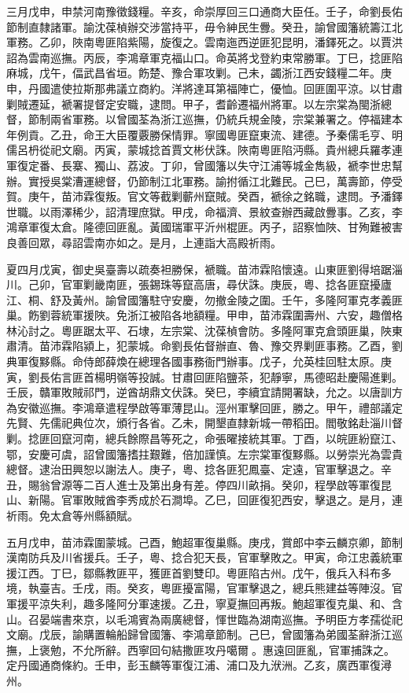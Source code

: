 \begin{pinyinscope}
三月戊申，申禁河南豫徵錢糧。辛亥，命崇厚回三口通商大臣任。壬子，命劉長佑節制直隸諸軍。諭沈葆楨辦交涉當持平，毋令紳民生釁。癸丑，諭曾國籓統籌江北軍務。乙卯，陜南粵匪陷紫陽，旋復之。雲南迤西逆匪犯昆明，潘鐸死之。以賈洪詔為雲南巡撫。丙辰，李鴻章軍克福山口。命英將戈登約束常勝軍。丁巳，捻匪陷麻城，戊午，偪武昌省垣。飭楚、豫合軍攻剿。己未，蠲浙江西安錢糧二年。庚申，丹國遣使拉斯那弗議立商約。洋將達耳第福陣亡，優恤。回匪圍平涼。以甘肅剿賊遷延，褫署提督定安職，逮問。甲子，耆齡遷福州將軍。以左宗棠為閩浙總督，節制兩省軍務。以曾國荃為浙江巡撫，仍統兵規金陵，宗棠兼署之。停福建本年例貢。乙丑，命王大臣覆覈勝保情罪。寧國粵匪竄東流、建德。予秦儒毛亨、明儒呂枬從祀文廟。丙寅，蒙城捻首賈文彬伏誅。陜南粵匪陷沔縣。貴州總兵羅孝連軍復定番、長寨、獨山、荔波。丁卯，曾國籓以失守江浦等城金雋級，褫李世忠幫辦。實授吳棠漕運總督，仍節制江北軍務。諭拊循江北難民。己巳，萬壽節，停受賀。庚午，苗沛霖復叛。官文等截剿蘄州竄賊。癸酉，褫徐之銘職，逮問。予潘鐸世職。以雨澤稀少，詔清理庶獄。甲戌，命福濟、景紋查辦西藏啟釁事。乙亥，李鴻章軍復太倉。隆德回匪亂。黃國瑞軍平沂州棍匪。丙子，詔察恤陜、甘殉難被害良善回眾，尋詔雲南亦如之。是月，上連詣大高殿祈雨。

夏四月戊寅，御史吳臺壽以疏奏袒勝保，褫職。苗沛霖陷懷遠。山東匪劉得培踞淄川。己卯，官軍剿畿南匪，張錫珠等竄高唐，尋伏誅。庚辰，粵、捻各匪竄擾廬江、桐、舒及黃州。諭曾國籓駐守安慶，勿撤金陵之圍。壬午，多隆阿軍克孝義匪巢。飭劉蓉統軍援陜。免浙江被陷各地額糧。甲申，苗沛霖圍壽州、六安，趣僧格林沁討之。粵匪踞太平、石埭，左宗棠、沈葆楨會防。多隆阿軍克倉頭匪巢，陜東肅清。苗沛霖陷潁上，犯蒙城。命劉長佑督辦直、魯、豫交界剿匪事務。乙酉，劉典軍復黟縣。命侍郎薛煥在總理各國事務衙門辦事。戊子，允英桂回駐太原。庚寅，劉長佑言匪首楊明嶺等投誠。甘肅回匪陷鹽茶，犯靜寧，馬德昭赴慶陽進剿。壬辰，贛軍敗賊祁門，逆酋胡鼎文伏誅。癸巳，李續宜請開署缺，允之。以唐訓方為安徽巡撫。李鴻章遣程學啟等軍薄昆山。涇州軍擊回匪，勝之。甲午，禮部議定先賢、先儒祀典位次，頒行各省。乙未，開墾直隸新城一帶稻田。閻敬銘赴淄川督剿。捻匪回竄河南，總兵餘際昌等死之，命張曜接統其軍。丁酉，以皖匪紛竄江、鄂，安慶可虞，詔曾國籓搘拄艱難，倍加謹慎。左宗棠軍復黟縣。以勞崇光為雲貴總督。逮治田興恕以謝法人。庚子，粵、捻各匪犯鳳臺、定遠，官軍擊退之。辛丑，賜翁曾源等二百人進士及第出身有差。停四川畝捐。癸卯，程學啟等軍復昆山、新陽。官軍敗賊酋李秀成於石澗埠。乙巳，回匪復犯西安，擊退之。是月，連祈雨。免太倉等州縣額賦。

五月戊申，苗沛霖圍蒙城。己酉，鮑超軍復巢縣。庚戌，賞郎中李云麟京卿，節制漢南防兵及川省援兵。壬子，粵、捻合犯天長，官軍擊敗之。甲寅，命江忠義統軍援江西。丁巳，鄒縣教匪平，獲匪首劉雙印。粵匪陷古州。戊午，俄兵入科布多境，執臺吉。壬戌，雨。癸亥，粵匪擾富陽，官軍擊退之，總兵熊建益等陣沒。官軍援平涼失利，趣多隆阿分軍速援。乙丑，寧夏撫回再叛。鮑超軍復克巢、和、含山。召晏端書來京，以毛鴻賓為兩廣總督，惲世臨為湖南巡撫。予明臣方孝孺從祀文廟。戊辰，諭購置輪船歸曾國籓、李鴻章節制。己巳，曾國籓為弟國荃辭浙江巡撫，上褒勉，不允所辭。西寧回句結撒匪攻丹噶爾。惠遠回匪亂，官軍捕誅之。定丹國通商條約。壬申，彭玉麟等軍復江浦、浦口及九洑洲。乙亥，廣西軍復潯州。


\end{pinyinscope}
